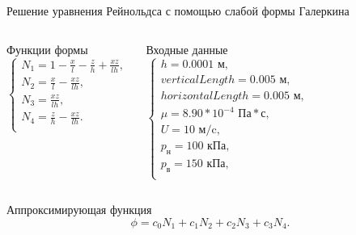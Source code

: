 \documentclass[ignoreonframetext,unicode]{beamer}
\begin{document}
\begin{frame}{Решение уравнения Рейнольдса с помощью слабой формы Галеркина}
	
\begin{columns}
		
	\begin{block}{Функции формы}
		\[
			\begin{cases}
				N_1 = 1 - \frac{x}{l} - \frac{z}{h} + \frac{x  z}{l  h}, \\
				N_2 = \frac{x}{l} - \frac{x  z}{l  h}, \\
				N_3 = \frac{x  z}{l h}, \\
				N_4 = \frac{z}{h} - \frac{x  z}{l  h}. \\
			\end{cases}
			\label{form-func}
		\]
		\end{block}
	
	\begin{block}{Входные данные}
	\[
		\begin{cases}
			h = 0.0001 \text{ м}, \\
			verticalLength = 0.005 \text{ м}, \\
			horizontalLength = 0.005 \text{ м}, \\
			\mu = 8.90 * 10^{-4} \text{ Па}*\text{с}, \\
			U = 10 \text{ м/c}, \\
			p_{\text{н}} = 100 \text{ кПа}, \\
			p_{\text{в}} = 150 \text{ кПа}, \\
		\end{cases}	
	\]
\end{block}
\end{columns}

\begin{block}{Аппроксимирующая функция}
	\[
	\phi = c_0 N_1 + c_1 N_2 + c_2 N_3 + c_3 N_4.
	\]
\end{block}
	
\end{frame}
\end{document}
